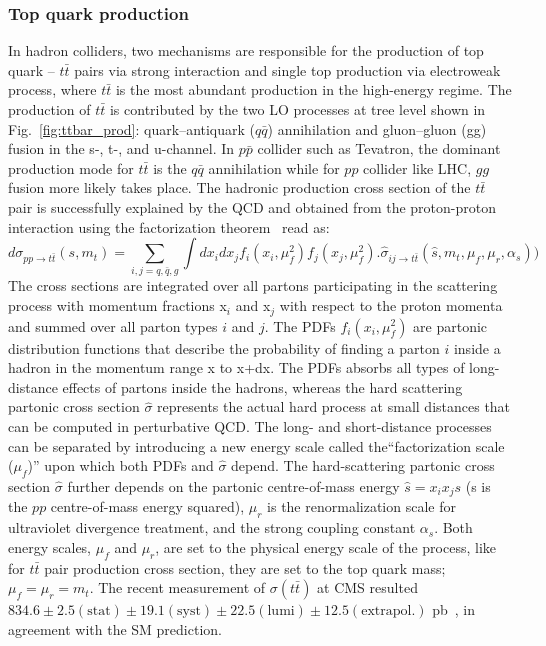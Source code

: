 \subsubsection*{Top quark production}
In hadron colliders, two mechanisms are responsible for the production of top quark – $t\bar{t}$ pairs via strong interaction and single top production via electroweak process, where $t\bar{t}$ is the most abundant production in the high-energy regime. The production of $t\bar{t}$ is contributed by the two LO processes at tree level shown in Fig.~\ref{fig:ttbar_prod}: quark–antiquark ($q\bar{q}$) annihilation and gluon–gluon (gg) fusion in the s-, t-, and u-channel. In $p\bar{p}$ collider such as Tevatron, the dominant production mode for $t\bar{t}$ is the $q\bar{q}$ annihilation while for $pp$ collider like LHC, $gg$ fusion more likely takes place. The hadronic production cross section of the $t\bar{t}$ pair is successfully explained by the QCD and obtained from the proton-proton interaction using the factorization theorem~\cite{ttbar_production} read as:
\begin{equation}
d\sigma_{pp\rightarrow t\bar{t}}(s,m_{t}) = \sum\limits_{i,j=q,\bar{q},g}\int dx_{i}dx_{j}f_{i}(x_{i},\mu^{2}_{f})f_{j}(x_{j},\mu^{2}_{f}).\hat{\sigma}_{ij\rightarrow t\bar{t}}(\hat{s}, m_{t}, \mu_{f},\mu_{r}, \alpha_{s}))
\end{equation}
The cross sections are integrated over all partons participating in the scattering process with momentum fractions x$_i$ and x$_j$ with respect to the proton momenta and summed over all parton types $i$ and $j$. The PDFs $f_{i}(x_{i}, \mu^{2}_{f})$ are partonic distribution functions that describe the probability of finding a parton $i$ inside a hadron in the momentum range x to x+dx. The PDFs absorbs all types of long-distance effects of partons inside the hadrons, whereas the hard scattering partonic cross section $\hat{\sigma}$ represents the actual hard process at small distances that can be computed in perturbative QCD. The long- and short-distance processes can be separated by introducing a new energy scale called the“factorization scale ($\mu_{f}$)” upon which both PDFs and $\hat{\sigma}$ depend. The hard-scattering partonic cross section $\hat{\sigma}$ further depends on the partonic centre-of-mass energy $\hat{s} = x_{i}x_{j}s$ (s is the $pp$ centre-of-mass energy squared), $\mu_{r}$ is the renormalization scale for ultraviolet divergence treatment, and the strong coupling constant $\alpha_{s}$. Both energy scales, $\mu_{f}$ and $\mu_{r}$, are set to the physical energy scale of the process, like for $t\bar{t}$ pair production cross section, they are set to the top quark mass; $\mu_{f} = \mu_{r} = m_{t}$. The recent measurement of $\sigma(t\bar{t})$ at CMS resulted $834.6\pm 2.5 (\text{stat})\pm 19.1 (\text{syst})\pm 22.5 (\text{lumi})\pm 12.5 (\text{extrapol.})$ pb~\cite{CMS-AN-15-233}, in agreement with the SM prediction.
